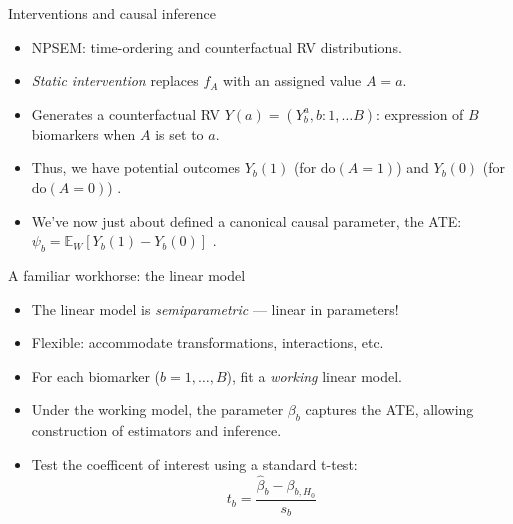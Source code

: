 \documentclass{beamer}
\newcommand{\E}{\mathbb{E}}
\begin{document}

\begin{frame}[c]{Interventions and causal inference}
\begin{center}
\begin{itemize}
  \itemsep12pt
  \item NPSEM: time-ordering and counterfactual RV distributions.
  \item \textit{Static intervention} replaces $f_A$ with an assigned value
    $A = a$.
  \item Generates a counterfactual RV $Y(a) = (Y_b^{a}, b: 1, \ldots B)$:
    expression of $B$ biomarkers when $A$ is set to $a$.
  \item Thus, we have potential outcomes $Y_b(1)$ (for $\text{do}(A=1)$) and
    $Y_b(0)$ (for $\text{do}(A=0)$) \citep{rubin2005causal}.
  \item We've now just about defined a canonical causal parameter, the ATE:
    $\psi_b = \E_W[Y_b(1) - Y_b(0)]$ \citep{pearl2000causality}.
\end{itemize}
\end{center}

\end{frame}



\begin{frame}[c]{A familiar workhorse: the linear model}
\begin{center}
\begin{itemize}
  \itemsep12pt
  \item The linear model is \textit{semiparametric} --- linear in parameters!
  \item Flexible: accommodate transformations, interactions, etc.
  \item For each biomarker ($b = 1, \ldots, B$), fit a \textit{working} linear
    model.
  \item Under the working model, the parameter $\beta_b$ captures the ATE,
    allowing construction of estimators and inference.
  \item Test the coefficent of interest using a standard t-test:
    \[ t_{b} = \frac{\hat{\beta}_{b} - \beta_{b, H_0}}{s_b} \]
\end{itemize}
\end{center}

\end{frame}
\end{document}
